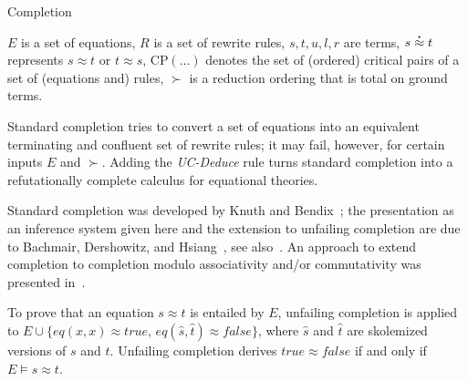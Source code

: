 \begin{entry}{Completion}
\begin{calculus}
$E$ is a set of equations,
$R$ is a set of rewrite rules,
$s,t,u,l,r$ are terms,
$s \deq t$ represents $s \approx t$ or $t \approx s$,
$\mathrm{CP}(\dots)$ denotes the set of (ordered) critical
pairs of a set of (equations and) rules,
$\succ$ is a reduction ordering that is total on ground terms.

\end{calculus}


\begin{clarifications}
Standard completion tries to convert a set of equations into
an equivalent terminating and confluent set of rewrite rules;
it may fail, however, for certain inputs $E$ and $\succ$.
Adding the \textit{UC-Deduce} rule turns standard completion into
a refutationally complete calculus for equational theories.
\end{clarifications}

\begin{history}
Standard completion was developed by Knuth and Bendix~\cite{KnuthBendix1970};
the presentation as an inference system given here
and the extension to unfailing completion
are due to
Bachmair, Dershowitz, and Hsiang~\cite{BachmairDershowitzHsiang1986LICS},
see also~\cite{Bachmair1991}.
An approach to extend completion to completion modulo
associativity and/or commutativity was presented in~\cite{PetersonStickel1981}.

\end{history}

\begin{technicalities}
To prove that an equation $s \approx t$ is entailed by $E$,
unfailing completion is
applied to $E \cup \{\mathit{eq}(x,x) \approx \mathit{true}$,
$\mathit{eq}(\hat{s},\hat{t}) \approx \mathit{false}\}$,
where $\hat{s}$ and $\hat{t}$ are skolemized versions of $s$ and $t$.
Unfailing completion derives $\mathit{true} \approx \mathit{false}$
if and only if $E \models s \approx t$.
\end{technicalities}




\end{entry}
